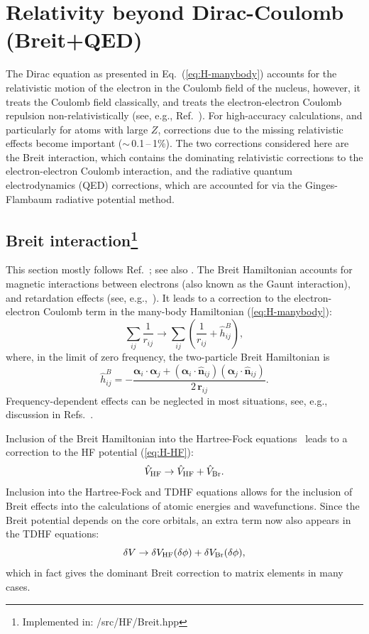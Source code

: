 \documentclass[10pt,twocolumn,a4paper]{article}%
\renewcommand{\v}[1]{\ensuremath{\boldsymbol{#1}}}		%
\newcommand{\vhat}[1]{\ensuremath{\hat{\boldsymbol{#1}}}}		%
\newcommand{\be}{\begin{equation}}
\newcommand{\ee}{\end{equation}}
\renewcommand{\a}{\ensuremath{\alpha}}
\begin{document}
\section{Relativity beyond Dirac-Coulomb (Breit+QED)}


The Dirac equation as presented in Eq.~(\ref{eq:H-manybody})
accounts for the relativistic motion of the electron in the Coulomb field of the nucleus, however, it treats the Coulomb field classically, and treats the electron-electron Coulomb repulsion non-relativistically (see, e.g., Ref.~\cite{BetheBook}).
For high-accuracy calculations, and particularly for atoms with large $Z$, corrections due to the missing relativistic effects become important ($\sim$\,0.1\,--\,1\%).
The two corrections considered here are the
Breit interaction, which contains the dominating relativistic corrections to the electron-electron Coulomb interaction, and 
the radiative quantum electrodynamics (QED) corrections, which are accounted for via the Ginges-Flambaum radiative potential method.




\subsection[Breit interaction]{Breit interaction\footnote{Implemented in: /src/HF/Breit.hpp}\label{sec:Breit}}

This section mostly follows Ref.~\cite{JohnsonBook2007}; see also \cite{Johnson1988a,Mann1971,Derevianko2001}.
The Breit Hamiltonian accounts for magnetic interactions between electrons (also known as the Gaunt interaction), and retardation effects (see, e.g.,~\cite{BetheBook}).
It leads to a correction to the electron-electron Coulomb term in the many-body Hamiltonian (\ref{eq:H-manybody}):
\be
\sum_{ij}\frac{1}{r_{ij}}
\to
\sum_{ij}\left( \frac{1}{r_{ij}} + \hat h^B_{ij}\right),
\ee
where, in the limit of zero frequency, the two-particle Breit Hamiltonian is
\be
\hat h^B_{ij} = - \frac{\v{\a}_i\cdot\v{\a}_j + (\v{\a}_i\cdot\vhat{n}_{ij})(\v{\a}_j\cdot\vhat{n}_{ij})}{2\, \v{r}_{ij}}.
\ee
Frequency-dependent effects can be neglected in most situations, see, e.g., discussion in Refs.~\cite{BetheBook,JohnsonBook2007}.

Inclusion of the Breit Hamiltonian into the Hartree-Fock equations~\cite{Derevianko2001} leads to a correction to the HF potential (\ref{eq:H-HF}):
\be
\hat V_{\rm HF} \to  \hat V_{\rm HF}  + \hat V_{\rm Br} .
\ee
Inclusion into the Hartree-Fock and TDHF equations allows for the inclusion of Breit effects into the calculations of atomic energies and wavefunctions.
Since the Breit potential depends on the core orbitals, an extra term now also appears in the TDHF equations: 
\be
\delta V\to \delta V_{\rm HF}(\delta\phi)+\delta V_{\rm Br}(\delta\phi),
\ee
which in fact gives the dominant Breit correction to matrix elements in many cases.
\end{document}

